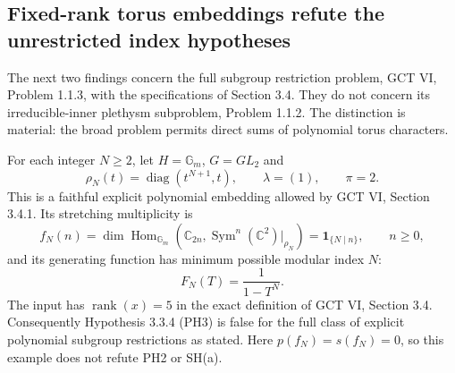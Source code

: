 \subsection{Fixed-rank torus embeddings refute the unrestricted index hypotheses}

The next two findings concern the full subgroup restriction problem,
GCT VI, Problem 1.1.3, with the specifications of Section 3.4.
They do not concern its irreducible-inner plethysm subproblem,
Problem 1.1.2. The distinction is material: the broad problem permits
direct sums of polynomial torus characters.

\begin{proposition}
\label{prop:torusmodular}
For each integer $N\ge2$, let $H=\mathbb G_m$, $G=GL_2$ and
\[
 \rho_N(t)=\operatorname{diag}(t^{N+1},t),\qquad
 \lambda=(1),\qquad \pi=2.
\]
This is a faithful explicit polynomial embedding allowed by
GCT VI, Section 3.4.1. Its stretching multiplicity is
\[
 f_N(n)=\dim\operatorname{Hom}_{\mathbb G_m}
       (\mathbb C_{2n},\operatorname{Sym}^n(\mathbb C^2)|_{\rho_N})
       =\mathbf1_{\{N\mid n\}},\qquad n\ge0,
\]
and its generating function has minimum possible modular index $N$:
\[
 F_N(T)=\frac1{1-T^N}.
 \tag{P-F14}
\]
The input has $\operatorname{rank}(x)=5$ in the exact definition of
GCT VI, Section 3.4. Consequently Hypothesis 3.3.4 (PH3) is false for
the full class of explicit polynomial subgroup restrictions as stated.
Here $p(f_N)=s(f_N)=0$, so this example does not refute PH2 or SH(a).
\end{proposition}

